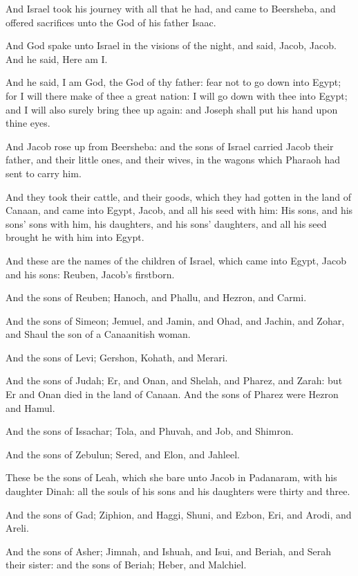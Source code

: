 \Chapter
\Verse And Israel took his journey with all that he had, and came to Beersheba, and offered sacrifices unto the God of his father Isaac.

\Verse And God spake unto Israel in the visions of the night, and said, Jacob, Jacob. And he said, Here am I.

\Verse And he said, I am God, the God of thy father: fear not to go down into Egypt; for I will there make of thee a great nation: \Verse I will go down with thee into Egypt; and I will also surely bring thee up again: and Joseph shall put his hand upon thine eyes.

\Verse And Jacob rose up from Beersheba: and the sons of Israel carried Jacob their father, and their little ones, and their wives, in the wagons which Pharaoh had sent to carry him.

\Verse And they took their cattle, and their goods, which they had gotten in the land of Canaan, and came into Egypt, Jacob, and all his seed with him: \Verse His sons, and his sons' sons with him, his daughters, and his sons' daughters, and all his seed brought he with him into Egypt.

\Verse And these are the names of the children of Israel, which came into Egypt, Jacob and his sons: Reuben, Jacob's firstborn.

\Verse And the sons of Reuben; Hanoch, and Phallu, and Hezron, and Carmi.

\Verse And the sons of Simeon; Jemuel, and Jamin, and Ohad, and Jachin, and Zohar, and Shaul the son of a Canaanitish woman.

\Verse And the sons of Levi; Gershon, Kohath, and Merari.

\Verse And the sons of Judah; Er, and Onan, and Shelah, and Pharez, and Zarah: but Er and Onan died in the land of Canaan. And the sons of Pharez were Hezron and Hamul.

\Verse And the sons of Issachar; Tola, and Phuvah, and Job, and Shimron.

\Verse And the sons of Zebulun; Sered, and Elon, and Jahleel.

\Verse These be the sons of Leah, which she bare unto Jacob in Padanaram, with his daughter Dinah: all the souls of his sons and his daughters were thirty and three.

\Verse And the sons of Gad; Ziphion, and Haggi, Shuni, and Ezbon, Eri, and Arodi, and Areli.

\Verse And the sons of Asher; Jimnah, and Ishuah, and Isui, and Beriah, and Serah their sister: and the sons of Beriah; Heber, and Malchiel.

